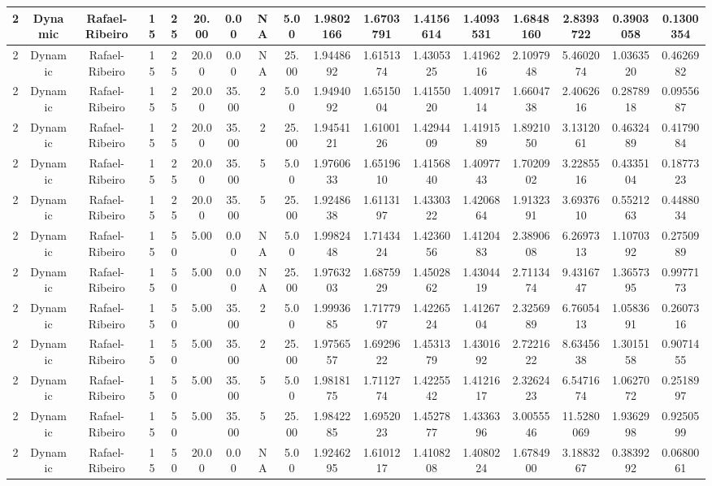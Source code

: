 \begin{longtable}{ | c | c | c | c | c | c | c | c | c | c | c | c | c | c | c | c | c | }
	\hline
	2	&	Dynamic	&	Rafael-Ribeiro	&	15	&	25	&	20.00	&	0.00	&	NA	&	5.00	&	1.9802166	&	1.6703791	&	1.4156614	&	1.4093531	&	1.6848160	&	2.8393722	&	0.3903058	&	0.1300354 \\
	\hline
	2	&	Dynamic	&	Rafael-Ribeiro	&	15	&	25	&	20.00	&	0.00	&	NA	&	25.00	&	1.9448692	&	1.6151374	&	1.4305325	&	1.4196216	&	2.1097948	&	5.4602074	&	1.0363520	&	0.4626982 \\
	\hline
	2	&	Dynamic	&	Rafael-Ribeiro	&	15	&	25	&	20.00	&	35.00	&	2	&	5.00	&	1.9494092	&	1.6515004	&	1.4155020	&	1.4091714	&	1.6604738	&	2.4062616	&	0.2878918	&	0.0955687 \\
	\hline
	2	&	Dynamic	&	Rafael-Ribeiro	&	15	&	25	&	20.00	&	35.00	&	2	&	25.00	&	1.9454121	&	1.6100126	&	1.4294409	&	1.4191589	&	1.8921050	&	3.1312061	&	0.4632489	&	0.4179084 \\
	\hline
	2	&	Dynamic	&	Rafael-Ribeiro	&	15	&	25	&	20.00	&	35.00	&	5	&	5.00	&	1.9760633	&	1.6519610	&	1.4156840	&	1.4097743	&	1.7020902	&	3.2285516	&	0.4335104	&	0.1877323 \\
	\hline
	2	&	Dynamic	&	Rafael-Ribeiro	&	15	&	25	&	20.00	&	35.00	&	5	&	25.00	&	1.9248638	&	1.6113197	&	1.4330322	&	1.4206864	&	1.9132391	&	3.6937610	&	0.5521263	&	0.4488034 \\
	\hline
	2	&	Dynamic	&	Rafael-Ribeiro	&	15	&	50	&	5.00	&	0.00	&	NA	&	5.00	&	1.9982448	&	1.7143424	&	1.4236056	&	1.4120483	&	2.3890608	&	6.2697313	&	1.1070392	&	0.2750989 \\
	\hline
	2	&	Dynamic	&	Rafael-Ribeiro	&	15	&	50	&	5.00	&	0.00	&	NA	&	25.00	&	1.9763203	&	1.6875929	&	1.4502862	&	1.4304419	&	2.7113474	&	9.4316747	&	1.3657395	&	0.9977173 \\
	\hline
	2	&	Dynamic	&	Rafael-Ribeiro	&	15	&	50	&	5.00	&	35.00	&	2	&	5.00	&	1.9993685	&	1.7177997	&	1.4226524	&	1.4126704	&	2.3256989	&	6.7605413	&	1.0583691	&	0.2607316 \\
	\hline
	2	&	Dynamic	&	Rafael-Ribeiro	&	15	&	50	&	5.00	&	35.00	&	2	&	25.00	&	1.9756557	&	1.6929622	&	1.4531379	&	1.4301692	&	2.7221622	&	8.6345638	&	1.3015158	&	0.9071455 \\
	\hline
	2	&	Dynamic	&	Rafael-Ribeiro	&	15	&	50	&	5.00	&	35.00	&	5	&	5.00	&	1.9818175	&	1.7112774	&	1.4225542	&	1.4121617	&	2.3262423	&	6.5471674	&	1.0627072	&	0.2518997 \\
	\hline
	2	&	Dynamic	&	Rafael-Ribeiro	&	15	&	50	&	5.00	&	35.00	&	5	&	25.00	&	1.9842285	&	1.6952023	&	1.4527877	&	1.4336396	&	3.0055546	&	11.5280069	&	1.9362998	&	0.9250599 \\
	\hline
	2	&	Dynamic	&	Rafael-Ribeiro	&	15	&	50	&	20.00	&	0.00	&	NA	&	5.00	&	1.9246295	&	1.6101217	&	1.4108208	&	1.4080224	&	1.6784900	&	3.1883267	&	0.3839292	&	0.0680061 \\

\end{longtable}
